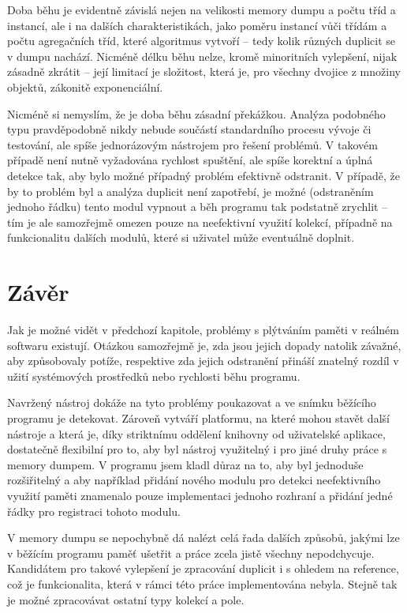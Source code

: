 Doba běhu je evidentně závislá nejen na velikosti memory dumpu a počtu tříd a instancí, ale i na dalších charakteristikách, jako poměru instancí vůči třídám a počtu agregačních tříd, které algoritmus vytvoří -- tedy kolik různých duplicit se v dumpu nachází. Nicméně délku běhu nelze, kromě minoritních vylepšení, nijak zásadně zkrátit -- její limitací je složitost, která je, pro všechny dvojice z množiny objektů, zákonitě exponenciální.

Nicméně si nemyslím, že je doba běhu zásadní překážkou. Analýza podobného typu pravděpodobně nikdy nebude součástí standardního procesu vývoje či testování, ale spíše jednorázovým nástrojem pro řešení problémů. V takovém případě není nutně vyžadována rychlost spuštění, ale spíše korektní a úplná detekce tak, aby bylo možné případný problém efektivně odstranit. V případě, že by to problém byl a analýza duplicit není zapotřebí, je možné (odstraněním jednoho řádku) tento modul vypnout a běh programu tak podstatně zrychlit -- tím je ale samozřejmě omezen pouze na neefektivní využití kolekcí, případně na funkcionalitu dalších modulů, které si uživatel může eventuálně doplnit.

\chapter{Závěr}
Jak je možné vidět v předchozí kapitole, problémy s plýtváním paměti v reálném softwaru existují. Otázkou samozřejmě je, zda jsou jejich dopady natolik závažné, aby způsobovaly potíže, respektive zda jejich odstranění přináší znatelný rozdíl v užití systémových prostředků nebo rychlosti běhu programu. 

Navržený nástroj dokáže na tyto problémy poukazovat a ve snímku běžícího programu je detekovat. Zároveň vytváří platformu, na které mohou stavět další nástroje a která je, díky striktnímu oddělení knihovny od uživatelské aplikace, dostatečně flexibilní pro to, aby byl nástroj využitelný i pro jiné druhy práce s memory dumpem. V programu jsem kladl důraz na to, aby byl jednoduše rozšiřitelný a aby například přidání nového modulu pro detekci neefektivního využití paměti znamenalo pouze implementaci jednoho rozhraní a přidání jedné řádky pro registraci tohoto modulu. 

V memory dumpu se nepochybně dá nalézt celá řada dalších způsobů, jakými lze v běžícím programu paměť ušetřit a práce zcela jistě všechny nepodchycuje. Kandidátem pro takové vylepšení je zpracování duplicit i s ohledem na reference, což je funkcionalita, která v rámci této práce implementována nebyla. Stejně tak je možné zpracovávat ostatní typy kolekcí a pole.

